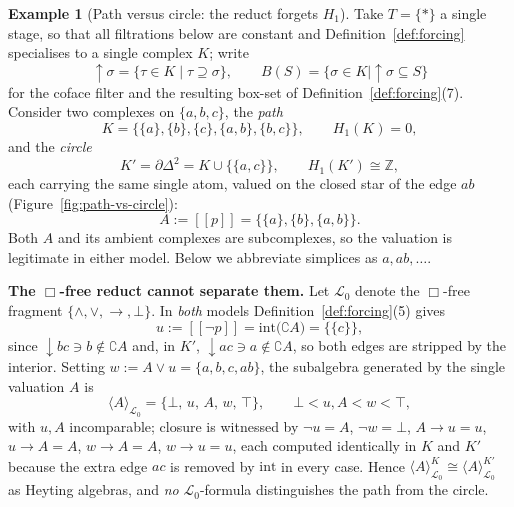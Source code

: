 \documentclass[final,12pt]{elsarticle}
\newcommand{\llbracket}{[\![}
\newcommand{\rrbracket}{]\!]}
\theoremstyle{plain}
\theoremstyle{definition}
\newtheorem{exa}[thm]{Example}
\begin{document}
\begin{exa}[Path versus circle: the reduct forgets \(H_1\)]
\label{ex:path-vs-circle}
Take \(T=\{\ast\}\) a single stage, so that all filtrations below are constant
and Definition~\ref{def:forcing} specialises to a single complex \(K\); write
\[
  \uparrow\!\sigma=\{\tau\in K\mid\tau\supseteq\sigma\},
  \qquad
  B(S)=\{\sigma\in K\mid\uparrow\!\sigma\subseteq S\}
\]
for the coface filter and the resulting box-set of
Definition~\ref{def:forcing}(7).  Consider two complexes on \(\{a,b,c\}\), the
\emph{path}
\[
  K=\bigl\{\{a\},\{b\},\{c\},\{a,b\},\{b,c\}\bigr\},
  \qquad H_1(K)=0,
\]
and the \emph{circle}
\[
  K'=\partial\Delta^{2}=K\cup\bigl\{\{a,c\}\bigr\},
  \qquad H_1(K')\cong\mathbb{Z},
\]
each carrying the same single atom, valued on the closed star of the edge
\(ab\) (Figure~\ref{fig:path-vs-circle}):
\[
  A:=\llbracket p\rrbracket=\bigl\{\{a\},\{b\},\{a,b\}\bigr\}.
\]
Both \(A\) and its ambient complexes are subcomplexes, so the valuation is
legitimate in either model.  Below we abbreviate simplices as \(a,ab,\dots\).

\medskip
\noindent\textbf{The \(\Box\)-free reduct cannot separate them.}
Let \(\mathcal{L}_0\) denote the \(\Box\)-free fragment
\(\{\wedge,\vee,\to,\bot\}\).  In \emph{both} models Definition~\ref{def:forcing}(5)
gives
\[
  u:=\llbracket\neg p\rrbracket
   =\mathrm{int}\bigl(\complement A\bigr)=\bigl\{\{c\}\bigr\},
\]
since \(\downarrow\!bc\ni b\notin\complement A\) and, in \(K'\),
\(\downarrow\!ac\ni a\notin\complement A\), so both edges are stripped by the
interior.  Setting \(w:=A\vee u=\{a,b,c,ab\}\), the subalgebra generated by the
single valuation \(A\) is
\[
  \langle A\rangle_{\mathcal{L}_0}=\{\bot,\,u,\,A,\,w,\,\top\},
  \qquad
  \bot<u,A<w<\top ,
\]
with \(u,A\) incomparable; closure is witnessed by \(\neg u=A\),
\(\neg w=\bot\), \(A\to u=u\), \(u\to A=A\), \(w\to A=A\), \(w\to u=u\),
each computed identically in \(K\) and \(K'\) because the extra edge \(ac\) is
removed by \(\mathrm{int}\) in every case.  Hence
\(\langle A\rangle_{\mathcal{L}_0}^{K}\cong
  \langle A\rangle_{\mathcal{L}_0}^{K'}\)
as Heyting algebras, and \emph{no} \(\mathcal{L}_0\)-formula distinguishes the
path from the circle.


\end{exa}
\end{document}
